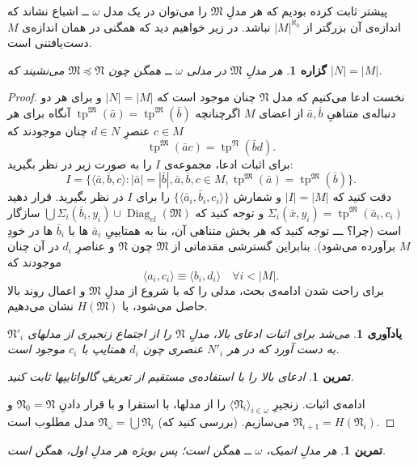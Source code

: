 \documentclass[12pt,a4paper]{report}
\theoremstyle{colorhead}
\newtheorem{tam}[thm]{تمرین}
\newtheorem{prop}[thm]{گزاره}
\newtheorem{yad}[thm]{یادآوری}
\DeclareMathOperator{\diag}{Diag}
\DeclareMathOperator{\tp}{tp}
\begin{document}
پیشتر ثابت کرده‌ بودیم که هر مدلِ
$\mathfrak{M}$
را می‌توان در یک مدل 
$\omega$ 
ــ
اشباع نشاند که اندازه‌ی آن بزرگتر از
$|M|^{\aleph_0}$
نباشد. در زیر خواهیم دید که همگنی در همان اندازه‌ی
$M$
دست‌یافتنی است.
\begin{prop}
هر مدلِ
$\mathfrak{M}$
در مدلی 
$\omega$
ــ
همگن چون
$\mathfrak{M}\preceq \mathfrak{N}$
می‌نشیند که
$|N|=|M|$.
\end{prop}
\begin{proof}
نخست ادعا می‌کنیم که
مدل
$\mathfrak{N}$
چنان موجود است که
$|N|=|M|$
و برای هر دو دنباله‌ی متناهیِ
$\bar{a},\bar{b}$
از اعضای 
$M$
اگرچنانچه
$\tp^\mathfrak{M}(\bar{a})=\tp^\mathfrak{M}(\bar{b})$
آنگاه برای هر
$c\in M$
عنصرِ
$d\in N$
چنان موجودند که
\[
\tp^\mathfrak{M}(\bar{a}c)=\tp^\mathfrak{N}(\bar{b}d).
\]
برای اثبات ادعا‌، مجموعه‌ی
$I$
را به صورت زیر در نظر بگیرید:
\[
I=\{\langle \bar{a},\bar{b},c\rangle: |\bar{a}|=|\bar{b}|, \bar{a},\bar{b},c\in M,\tp^\mathfrak{M}(\bar{a})=\tp^\mathfrak{M}(\bar{b})\}.
\]
دقت کنید
که
$|I|=|M|$
و شمارش 
$\{\langle\bar{a}_i,\bar{b}_i,c_i\rangle\}$
را برای 
$I$
در نظر بگیرید. قرار دهید
$\Sigma_i(\bar{x},y_i)=\tp^\mathfrak{M}(\bar{a}_i,c_i)$
و توجه کنید که
$\bigcup \Sigma_i(\bar{b}_i,y_i)\cup \diag_{el}(\mathfrak{M})$
سازگار است (چرا؟ ـــ توجه کنید که هر بخش متناهی آن، بنا به 
همتایپیِ
$\bar{a}_i$
ها با
$\bar{b}_i$
ها در خودِ
$M$
برآورده می‌شود). بنابراین
گسترشی مقدماتی از
$\mathfrak{M}$
چون
$\mathfrak{N}$
و عناصرِ
$d_i$
در آن چنان موجودند که 
\[
\langle a_i,c_i\rangle \equiv \langle b_i,d_i\rangle \quad \forall i<|M|.
\]
برای راحت شدن ادامه‌ی بحث،‌
مدلی 
 را که با شروع از مدلِ
$\mathfrak{M}$
و اعمال روند بالا حاصل می‌شود، با 
$H(\mathfrak{M})$
نشان می‌دهیم.
\begin{yad}
می‌شد برای اثبات ادعای بالا، مدلِ
$\mathfrak{N}$
را از اجتماع زنجیری از مدلهای
$\mathfrak{N}'_i$
به دست آورد که در
هر
$N'_i$
عنصری چون
$d_i$
همتایپ با
$c_i$
موجود است.  
\end{yad}
\begin{tam}
ادعای بالا را با استفاده‌ی مستقیم از تعریفِ گالواتایپها
ثابت کنید.
\end{tam}
ادامه‌ی اثبات. زنجیرِ
$\langle \mathfrak{N}_i\rangle_{i\in \omega}$
را از مدلها، با استقرا و با قرار دادنِ
\mbox{$\mathfrak{N}_0=\mathfrak{N}$}
و 
\mbox{$\mathfrak{N}_{i+1}=H(\mathfrak{N}_i)$}
می‌سازیم. (بررسی کنید که)
\mbox{$\mathfrak{N}_\omega=\bigcup \mathfrak{N}_i$}
مدل مطلوب است.
\end{proof}
\begin{tam}
هر مدلِ
اتمیک،
$\omega$
ــ
همگن است؛ پس بویژه هر مدلِ اول، همگن است.
\end{tam}
\end{document}
